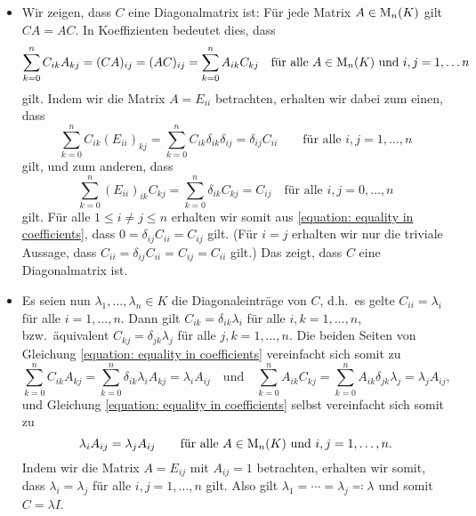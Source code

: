 \begin{itemize}
  \item
    Wir zeigen, dass $C$ eine Diagonalmatrix ist:
    Für jede Matrix $A \in \operatorname{M}_{n}(K)$ gilt $CA = AC$.
    In Koeffizienten bedeutet dies, dass
    \begin{equation}
      \label{equation: equality in coefficients}
        \sum_{k=0}^n C_{ik} A_{kj}
      = (CA)_{ij}
      = (AC)_{ij}
      = \sum_{k=0}^n A_{ik} C_{kj}
      \quad
      \text{für alle $A \in \operatorname{M}_{n}(K)$ und $i,j = 1, \dotsc n$}
    \end{equation}
    gilt.
    Indem wir die Matrix $A  = E_{ii}$ betrachten, erhalten wir dabei zum einen, dass
    \[
        \sum_{k=0}^n C_{ik} (E_{ii})_{kj}
      = \sum_{k=0}^n C_{ik} \delta_{ik} \delta_{ij}
      = \delta_{ij} C_{ii}
      \qquad
      \text{für alle $i, j = 1, \dotsc, n$}
    \]
    gilt, und zum anderen, dass
    \[
          \sum_{k=0}^n (E_{ii})_{ik} C_{kj}
        = \sum_{k=0}^n \delta_{ik} C_{kj}
        = C_{ij}
        \quad
        \text{für alle $i, j = 0, \dotsc, n$}
    \]
    gilt.
    Für alle $1 \leq i \neq j \leq n$ erhalten wir somit aus \eqref{equation: equality in coefficients}, dass $0 = \delta_{ij} C_{ii} = C_{ij}$ gilt.
    (Für $i = j$ erhalten wir nur die triviale Aussage, dass $C_{ii} = \delta_{ij} C_{ii} = C_{ij} = C_{ii}$ gilt.)
    Das zeigt, dass $C$ eine Diagonalmatrix ist.
    
  \item
    Es seien nun $\lambda_1, \dotsc, \lambda_n \in K$ die Diagonaleinträge von $C$, d.h.\ es gelte $C_{ii} = \lambda_i$ für alle $i = 1, \dotsc, n$.
    Dann gilt $C_{ik} = \delta_{ik} \lambda_i$ für alle $i, k = 1, \dotsc, n$, bzw.\ äquivalent $C_{kj} = \delta_{jk} \lambda_j$ für alle $j, k = 1, \dotsc, n$.
    Die beiden Seiten von Gleichung \eqref{equation: equality in coefficients} vereinfacht sich somit zu
    \[
        \sum_{k=0}^n C_{ik} A_{kj}
      = \sum_{k=0}^n \delta_{ik} \lambda_i A_{kj}
      = \lambda_i A_{ij}
      \quad\text{und}\quad
        \sum_{k=0}^n A_{ik} C_{kj}
      = \sum_{k=0}^n A_{ik} \delta_{jk} \lambda_j
      = \lambda_j A_{ij},
    \]
    und Gleichung \eqref{equation: equality in coefficients} selbst vereinfacht sich somit zu
    \[
        \lambda_i A_{ij}
      = \lambda_j A_{ij}
      \qquad
      \text{für alle $A \in \operatorname{M}_{n}(K)$ und $i, j = 1, \dotsc, n$}.
    \]
    Indem wir die Matrix $A = E_{ij}$ mit $A_{ij} = 1$ betrachten, erhalten wir somit, dass $\lambda_i = \lambda_j$ für alle $i,j = 1, \dotsc, n$ gilt.
    Also gilt $\lambda_1 = \dotsb = \lambda_j \eqqcolon \lambda$ und somit $C = \lambda I$.
\end{itemize}



